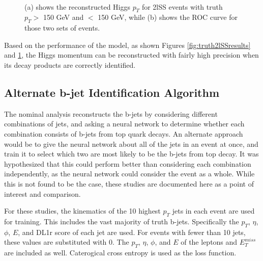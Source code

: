 \begin{figure}[H]
    \\
    \caption{(a) shows the reconstructed Higgs $p_T$ for 2lSS events with truth $p_T > $ 150 GeV and $<$ 150 GeV, while (b) shows the ROC curve for those two sets of events.}
    \label{fig:truth2lSSroc}
\end{figure}

Based on the performance of the model, as shown Figures \ref{fig:truth2lSSresults} and \ref{fig:truth2lSSroc}, the Higgs momentum can be reconstructed with fairly high precision when its decay products are correctly identified.

\subsection{Alternate b-jet Identification Algorithm}
\label{subsec:topRecoApx}

The nominal analysis reconstructs the b-jets by considering different combinations of jets, and asking a neural network to determine whether each combination consists of b-jets from top quark decays. An alternate approach would be to give the neural network about all of the jets in an event at once, and train it to select which two are most likely to be the b-jets from top decay. It was hypothesized that this could perform better than considering each combination independently, as the neural network could consider the event as a whole. While this is not found to be the case, these studies are documented here as a point of interest and comparison.

For these studies, the kinematics of the 10 highest $p_T$ jets in each event are used for training. This includes the vast majority of truth b-jets. Specifically the $p_T$, $\eta$, $\phi$, $E$, and DL1r score of each jet are used. For events with fewer than 10 jets, these values are substituted with 0. The $p_T$, $\eta$, $\phi$, and $E$ of the leptons and $E_T^{miss}$ are included as well. Caterogical cross entropy is used as the loss function.

